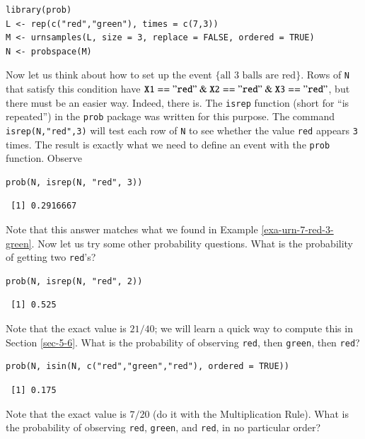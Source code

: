 \documentclass[captions=tableheading]{scrbook}
\begin{document}
\lstset{language=R}
\begin{lstlisting}
library(prob)
L <- rep(c("red","green"), times = c(7,3))
M <- urnsamples(L, size = 3, replace = FALSE, ordered = TRUE)
N <- probspace(M)
\end{lstlisting}

Now let us think about how to set up the event \(\{ \mbox{all 3 balls are red}\} \). Rows of \texttt{N} that satisfy this condition have \(\mathtt{X1=="red"\ \&\ X2=="red"\ \&\ X3=="red"}\), but there must be an easier way. Indeed, there is. The \texttt{isrep} function (short for ``is repeated'') in the \texttt{prob} package was written for this purpose. The command \texttt{isrep(N,"red",3)} will test each row of \texttt{N} to see whether the value \texttt{red} appears \texttt{3} times. The result is exactly what we need to define an event with the \texttt{prob} function. Observe


\lstset{language=R}
\begin{lstlisting}
prob(N, isrep(N, "red", 3))
\end{lstlisting}

\begin{verbatim}
 [1] 0.2916667
\end{verbatim}

Note that this answer matches what we found in Example \ref{exa-urn-7-red-3-green}. Now let us try some other probability questions. What is the probability of getting two \texttt{red}'s?


\lstset{language=R}
\begin{lstlisting}
prob(N, isrep(N, "red", 2))
\end{lstlisting}

\begin{verbatim}
 [1] 0.525
\end{verbatim}

Note that the exact value is \(21/40\); we will learn a quick way to compute this in Section \ref{sec-5-6}. What is the probability of observing \texttt{red}, then \texttt{green}, then \texttt{red}?


\lstset{language=R}
\begin{lstlisting}
prob(N, isin(N, c("red","green","red"), ordered = TRUE))
\end{lstlisting}

\begin{verbatim}
 [1] 0.175
\end{verbatim}

Note that the exact value is \(7/20\) (do it with the Multiplication Rule). What is the probability of observing \texttt{red}, \texttt{green}, and \texttt{red}, in no particular order?
\end{document}
